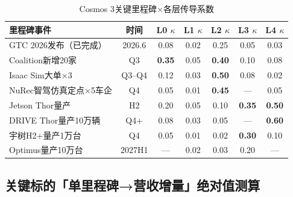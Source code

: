 \begin{table}[H]
\centering\scriptsize
\renewcommand{\arraystretch}{1.15}
\begin{tabularx}{\textwidth}{X c c c c c c}
\toprule
\textbf{里程碑事件} & \textbf{时间} & \textbf{L0} $\kappa$ & \textbf{L1} $\kappa$ & \textbf{L2} $\kappa$ & \textbf{L3} $\kappa$ & \textbf{L4} $\kappa$ \\
\midrule
GTC 2026发布（已完成） & 2026.6 & 0.08 & 0.02 & 0.25 & 0.05 & 0.03 \\
Coalition新增20家 & Q3 & \textbf{0.35} & 0.05 & \textbf{0.40} & 0.10 & 0.08 \\
Isaac Sim大单$\times$3 & Q3--Q4 & 0.12 & 0.03 & \textbf{0.50} & 0.08 & 0.02 \\
NuRec智驾仿真定点$\times$5车企 & Q4 & 0.05 & 0.01 & \textbf{0.45} & — & 0.05 \\
Jetson Thor量产 & H2 & 0.20 & 0.05 & 0.10 & \textbf{0.35} & \textbf{0.50} \\
DRIVE Thor量产10万辆 & Q4+ & 0.08 & 0.03 & 0.05 & — & \textbf{0.60} \\
宇树H2+量产1万台 & Q4 & 0.05 & 0.01 & 0.02 & \textbf{0.30} & 0.10 \\
Optimus量产10万台 & 2027H1 & — & 0.02 & 0.03 & 0.20 & — \\
\bottomrule
\end{tabularx}
\caption{Cosmos 3关键里程碑$\times$各层传导系数}
\end{table}

\subsection{关键标的「单里程碑→营收增量」绝对值测算}


